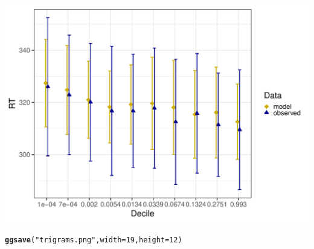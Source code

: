 \documentclass{article}\usepackage[]{graphicx}\usepackage[]{color}
\makeatletter
\def\maxwidth{ %
  \ifdim\Gin@nat@width>\linewidth
    \linewidth
  \else
    \Gin@nat@width
  \fi
}
\newcommand{\hlnum}[1]{\textcolor[rgb]{0.686,0.059,0.569}{#1}}%
\newcommand{\hlstr}[1]{\textcolor[rgb]{0.192,0.494,0.8}{#1}}%
\newcommand{\hlstd}[1]{\textcolor[rgb]{0.345,0.345,0.345}{#1}}%
\newcommand{\hlkwc}[1]{\textcolor[rgb]{0.333,0.667,0.333}{#1}}%
\newcommand{\hlkwd}[1]{\textcolor[rgb]{0.737,0.353,0.396}{\textbf{#1}}}%
\newenvironment{kframe}{%
 \def\at@end@of@kframe{}%
 \ifinner\ifhmode%
  \def\at@end@of@kframe{\end{minipage}}%
  \begin{minipage}{\columnwidth}%
 \fi\fi%
 \def\FrameCommand##1{\hskip\@totalleftmargin \hskip-\fboxsep
 \colorbox{shadecolor}{##1}\hskip-\fboxsep
     \hskip-\linewidth \hskip-\@totalleftmargin \hskip\columnwidth}%
 \MakeFramed {\advance\hsize-\width
   \@totalleftmargin\z@ \linewidth\hsize
   \@setminipage}}%
 {\par\unskip\endMakeFramed%
 \at@end@of@kframe}
\newenvironment{knitrout}{}{} %
\makeatother
\begin{document}
\begin{knitrout}
\color{fgcolor}
\includegraphics[width=\maxwidth]{figures/figure_ns_unnamed-chunk-11-1} 

\end{knitrout}

\begin{knitrout}
\color{fgcolor}\begin{kframe}
\begin{alltt}
\hlkwd{ggsave}\hlstd{(}\hlstr{"trigrams.png"}\hlstd{,} \hlkwc{width} \hlstd{=} \hlnum{19}\hlstd{,} \hlkwc{height} \hlstd{=} \hlnum{12}\hlstd{)}
\end{alltt}
\end{kframe}
\end{knitrout}
\end{document}
